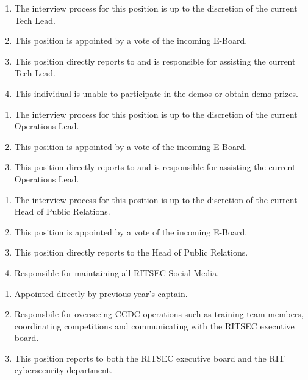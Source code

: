 
\begin{enumerate}
      \item The interview process for this position is up to the discretion of the current
            Tech Lead.
      \item This position is appointed by a vote of the incoming E-Board.
      \item This position directly reports to and is responsible for assisting the current
            Tech Lead.
      \item This individual is unable to participate in the demos or obtain demo prizes.
\end{enumerate}


\begin{enumerate}
      \item The interview process for this position is up to the discretion of the current
            Operations Lead.
      \item This position is appointed by a vote of the incoming E-Board.
      \item This position directly reports to and is responsible for assisting the current
            Operations Lead.
\end{enumerate}


\begin{enumerate}
      \item The interview process for this position is up to the discretion of the current
            Head of Public Relations.
      \item This position is appointed by a vote of the incoming E-Board.
      \item This position directly reports to the Head of Public Relations.
      \item Responsible for maintaining all RITSEC Social Media.
\end{enumerate}


\begin{enumerate}
      \item Appointed directly by previous year's captain.
      \item Responsbile for overseeing CCDC operations such as training team 
            members, coordinating competitions and communicating with the 
            RITSEC executive board.
      \item This position reports to both the RITSEC executive board and the
            RIT cybersecurity department.
\end{enumerate}

